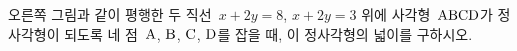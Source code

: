 \noindent\begin{minipage}[t]{0.58\linewidth}\vspace{0pt}\raggedright 오른쪽 그림과 같이 평행한 두 직선~$x+2y=8$, $x+2y=3$ 위에 사각형~$\mathrm{ABCD}$가 정사각형이 되도록 네 점~$\mathrm{A}$, $\mathrm{B}$, $\mathrm{C}$, $\mathrm{D}$를 잡을 때, 이 정사각형의 넓이를 구하시오.\end{minipage}\hfill\begin{minipage}[t]{0.4\linewidth}\vspace{0pt}\centering \resizebox{\ifdim\width>\linewidth\linewidth\else\width\fi}{!}{}\end{minipage}\par
